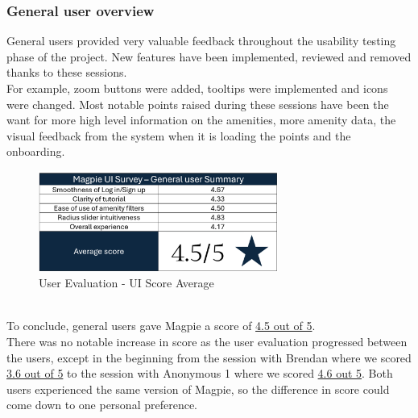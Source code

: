 \subsubsection{General user overview}
General users provided very valuable feedback throughout the usability testing phase of the project. New features have been implemented, reviewed and removed thanks to these sessions.\\
For example, zoom buttons were added, tooltips were implemented and icons were changed.
Most notable points raised during these sessions have been the want for more high level information on the amenities, more amenity data, the visual feedback from the system when it is loading the points and the onboarding.\\
\begin{figure}[h!]
    \centering
    \includegraphics[width=0.7\textwidth]{images/survey-casual-summary.png}
    \caption{User Evaluation - UI Score Average}
\end{figure}\\
To conclude, general users gave Magpie a score of \underline{4.5 out of 5}.\\
There was no notable increase in score as the user evaluation progressed between the users, except in the beginning from the session with Brendan where we scored \underline{3.6 out of 5} to the session with Anonymous 1 where we scored \underline{4.6 out 5}. Both users experienced the same version of Magpie, so the difference in score could come down to one personal preference.